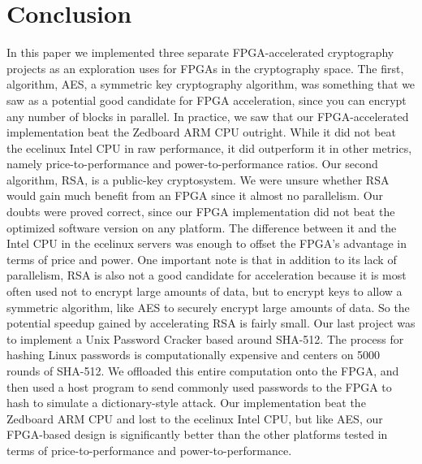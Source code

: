 \section{Conclusion}

In this paper we implemented three separate FPGA-accelerated cryptography projects as an exploration uses
for FPGAs in the cryptography space. The first, algorithm, AES, a symmetric key cryptography algorithm,
was something that we saw as a potential good candidate for FPGA acceleration, since you can encrypt any
number of blocks in parallel. In practice, we saw that our FPGA-accelerated implementation beat the
Zedboard ARM CPU outright. While it did not beat the ecelinux Intel CPU in raw performance, it did
outperform it in other metrics, namely price-to-performance and power-to-performance ratios. Our second
algorithm, RSA, is a public-key cryptosystem. We were unsure whether RSA would gain much benefit from an
FPGA since it almost no parallelism. Our doubts were proved correct, since our FPGA implementation did
not beat the optimized software version on any platform. The difference between it and the Intel CPU in
the ecelinux servers was enough to offset the FPGA's advantage in terms of price and power. One important
note is that in addition to its lack of parallelism, RSA is also not a good candidate for acceleration
because it is most often used not to encrypt large amounts of data, but to encrypt keys to allow a
symmetric algorithm, like AES to securely encrypt large amounts of data. So the potential speedup gained
by accelerating RSA is fairly small. Our last project was to implement a Unix Password Cracker based
around SHA-512. The process for hashing Linux passwords is computationally expensive and centers on 5000
rounds of SHA-512. We offloaded this entire computation onto the FPGA, and then used a host program to
send commonly used passwords to the FPGA to hash to simulate a dictionary-style attack. Our
implementation beat the Zedboard ARM CPU and lost to the ecelinux Intel CPU, but like AES, our FPGA-based
design is significantly better than the other platforms tested in terms of price-to-performance and
power-to-performance.
